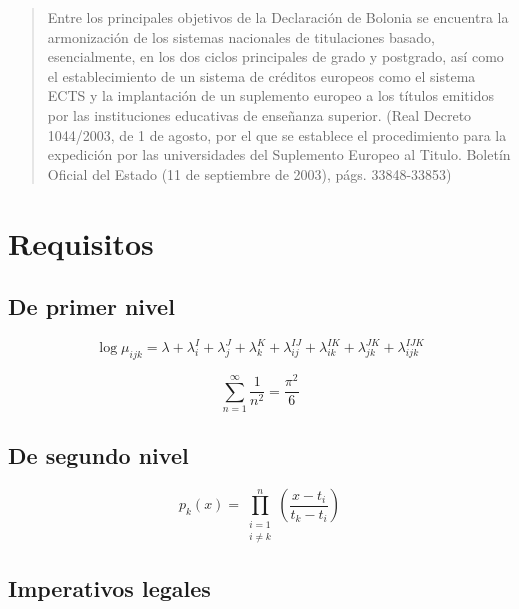 \documentclass[12pt]{report} %
\begin{document}
\blockquote{Entre los principales objetivos de la Declaración de Bolonia se encuentra la armonización de los sistemas nacionales de titulaciones basado, esencialmente, en los dos ciclos principales de grado y postgrado, así como	el establecimiento de un sistema de créditos europeos como el sistema ECTS y la implantación de un suplemento europeo a los títulos emitidos por las instituciones educativas de  enseñanza  superior. (Real  Decreto  1044/2003,  de  1  de  agosto,  por  el  que  se  establece  el  procedimiento para la expedición por las universidades del Suplemento Europeo al Titulo. Boletín Oficial del Estado (11 de septiembre de 2003), págs. 33848-33853)}

\lipsum[20-22]

\section{Requisitos}

\lipsum[15]

\subsection{De primer nivel}
\lipsum[15-16]

\begin{equation} %
\log \mu_{ijk}= \lambda + \lambda_i ^I + \lambda_j ^J+\lambda_k ^K+\lambda_{ij} ^{IJ}+\lambda_{ik} ^{IK}+\lambda_{jk} ^{JK}+\lambda_{ijk} ^{IJK}
\end{equation}

\lipsum[17]
\begin{equation}
	\sum_{n=1}^\infty\frac{1}{n^2}=\frac{\pi^2}{6}
\end{equation}


\lipsum[18]
	
\subsection{De segundo nivel}
\lipsum[8]
\begin{equation}
p_k(x)=\prod_{\substack{i=1\\i\ne k}}^n
\left(\frac{x-t_i}{t_k-t_i}\right)
\end{equation}

\lipsum[9]

\subsection{Imperativos legales}
\lipsum[8]
\end{document}
